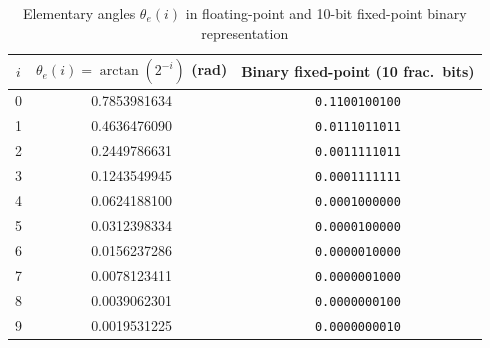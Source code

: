 \begin{table}[htbp]
    \centering
    \begin{tabular}{ccc}
    \toprule
    $i$ & $\theta_e(i) = \arctan(2^{-i})$ (rad) & Binary fixed-point (10 frac.~bits) \\
    \midrule
        0 & 0.7853981634 & \texttt{0.1100100100} \\
        1 & 0.4636476090 & \texttt{0.0111011011} \\
        2 & 0.2449786631 & \texttt{0.0011111011} \\
        3 & 0.1243549945 & \texttt{0.0001111111} \\
        4 & 0.0624188100 & \texttt{0.0001000000} \\
        5 & 0.0312398334 & \texttt{0.0000100000} \\
        6 & 0.0156237286 & \texttt{0.0000010000} \\
        7 & 0.0078123411 & \texttt{0.0000001000} \\
        8 & 0.0039062301 & \texttt{0.0000000100} \\
        9 & 0.0019531225 & \texttt{0.0000000010} \\
    \bottomrule
    \end{tabular}
    \caption{Elementary angles $\theta_e(i)$ in floating-point and 10-bit fixed-point binary representation}
    \label{tab:elementary_angles}
\end{table}
